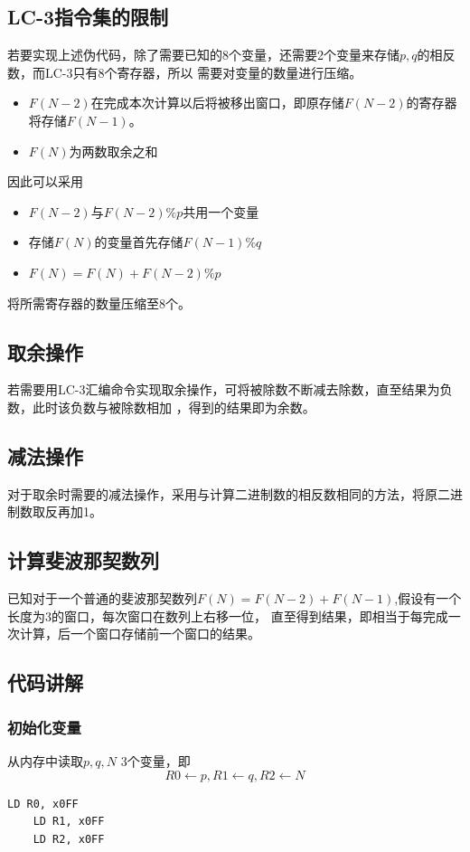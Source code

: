 \documentclass[12pt, a4paper, oneside]{ctexart}
\begin{document}
\subsection*{LC-3指令集的限制}
若要实现上述伪代码，除了需要已知的8个变量，还需要2个变量来存储$p,q$的相反数，而LC-3只有8个寄存器，所以
需要对变量的数量进行压缩。
\begin{itemize}
    \item $F(N-2)$在完成本次计算以后将被移出窗口，即原存储$F(N-2)$的寄存器将存储$F(N-1)$。
    \item $F(N)$为两数取余之和
\end{itemize}
因此可以采用
\begin{itemize}
    \item $F(N-2)$与$F(N-2) \% p$共用一个变量
    \item 存储$F(N)$的变量首先存储$F(N-1)\% q$
    \item $F(N) = F(N) + F(N-2) \% p$
\end{itemize}
将所需寄存器的数量压缩至8个。

\subsection*{取余操作}
若需要用LC-3汇编命令实现取余操作，可将被除数不断减去除数，直至结果为负数，此时该负数与被除数相加
，得到的结果即为余数。
\subsection*{减法操作}
对于取余时需要的减法操作，采用与计算二进制数的相反数相同的方法，将原二进制数取反再加1。

\subsection*{计算斐波那契数列}
已知对于一个普通的斐波那契数列$F(N) = F(N-2) + F(N-1)$,假设有一个长度为3的窗口，每次窗口在数列上右移一位，
直至得到结果，即相当于每完成一次计算，后一个窗口存储前一个窗口的结果。

\subsection*{代码讲解}
\subsubsection*{初始化变量}
从内存中读取$p,q,N$ 3个变量，即$$R0 \leftarrow p, R1 \leftarrow q, R2 \leftarrow N$$
\begin{lstlisting}[name = code, firstnumber = 1]
    LD R0, x0FF
    LD R1, x0FF
    LD R2, x0FF
\end{lstlisting}
\end{document}
